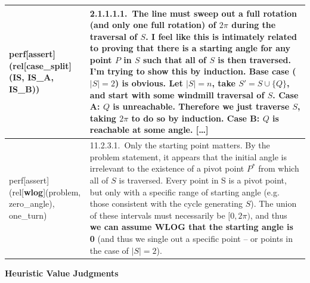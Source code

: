 \documentclass[smallextended,oneside]{svjour3}       %
\newcounter{turn}
\begin{document}
{\begin{tabular}{|p{}|p{}|}
perf[assert](rel[\textbf{case_split}](IS, IS_A, IS_B)) & 2.1.1.1.1.~The line must sweep out a full rotation (and only one full rotation) of $2\pi$ during the traversal of $S$. I feel like this is intimately related to proving that there is a starting angle for any point $P$ in $S$ such that all of $S$ is then traversed. I'm trying to show this by induction. Base case ($|S|=2$) is obvious. \textbf{Let $|S| = n$, take $S' = S \cup \{Q\}$, and start with some windmill traversal of $S$.} \textbf{Case A:} $Q$ is unreachable. Therefore we just traverse $S$, taking $2\pi$ to do so by induction. \textbf{Case B:} $Q$ is reachable at some angle. [\ldots] \\ \hline
perf[assert](rel[\textbf{wlog}](problem, zero_angle), one_turn) & 11.2.3.1.~Only the starting point matters. By the problem statement, it appears that the initial angle is irrelevant to the existence of a pivot point $P^*$ from which all of $S$ is traversed. Every point in S is a pivot point, but only with a specific range of starting angle (e.g. those consistent with the cycle generating $S$). The union of these intervals must necessarily be $[0,2\pi)$, and thus \textbf{we can assume WLOG that the starting angle is 0} (and thus we single out a specific point -- or points in the case of $|S| = 2$).\\
\hline
\end{tabular}

\newpage

{\centering
\textbf{Heuristic Value Judgments} 

\par}

\smallskip

}
\end{document}
